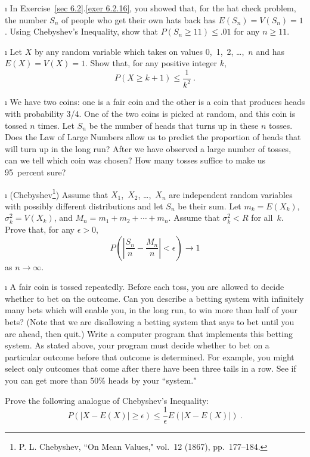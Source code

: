 \begin{LJSItem}
\i\label{exer 8.1.105} In Exercise~\ref{sec 6.2}.\ref{exer 6.2.16}, you showed that, for the
hat check problem, the number $S_n$ of people who get their own hats back has $E(S_n) =
V(S_n) = 1$.  Using Chebyshev's Inequality, show that $P(S_n \geq 11) \leq .01$
for any $n \geq 11$.

\i\label{exer 8.1.106} Let $X$ by any random variable which takes on values 0,~1,~2,
\dots,~$n$ and has $E(X) = V(X) = 1$.  Show that, for any positive integer $k$,
$$
P(X \geq k + 1) \leq \frac 1{k^2}\ .
$$

\i\label{exer 8.1.107} We have two coins: one is a fair coin and the other is a coin that
produces heads with probability 3/4.  One of the two coins is picked at random,
and this coin is tossed $n$ times.  Let $S_n$ be the number of heads that turns
up in these $n$ tosses.  Does the Law of Large Numbers allow us to predict the
proportion of heads that will turn up in the long run?  After we have observed
a large number of tosses, can we tell which coin was chosen?  How many tosses
suffice to make us 95~percent sure?

\i\label{exer 8.1.13} (Chebyshev\footnote{P. L. Chebyshev, ``On Mean
Values,"  vol.~12 (1867), pp.~177--184.})  Assume
that $X_1$,~$X_2$, \dots,~$X_n$ are independent random variables with possibly
different distributions and let $S_n$ be their sum.  Let $m_k = E(X_k)$,
$\sigma_k^2 = V(X_k)$, and $M_n = m_1 + m_2 +\cdots+ m_n$.  Assume that
$\sigma_k^2 < R$ for all~$k$.  Prove that, for any $\epsilon > 0$,
$$
P\left( \left| \frac {S_n}n - \frac {M_n}n \right| < \epsilon \right) \to 1
$$
as $n \rightarrow \infty$.

\i\label{exer 8.1.108}  A fair coin is tossed repeatedly.  Before each toss, you are allowed
to decide whether to bet on the outcome.  Can you describe a betting system with infinitely
many bets which will enable you, in the long run, to win more than half of your bets? 
(Note that we are disallowing a betting system that says to bet until you are ahead, then
quit.) Write a computer program that implements this betting system.  As stated above, your
program must decide whether to bet on a particular outcome before that outcome is determined.
For example, you might select only outcomes that come after
there have been three tails in a row.  See if you can get more than 50\% heads
by your ``system."

\istar\label{exer 8.1.109} Prove the following analogue of Chebyshev's Inequality:
$$
P(|X - E(X)| \geq \epsilon) \leq \frac 1\epsilon E(|X - E(X)|)\ .
$$


\end{LJSItem}
